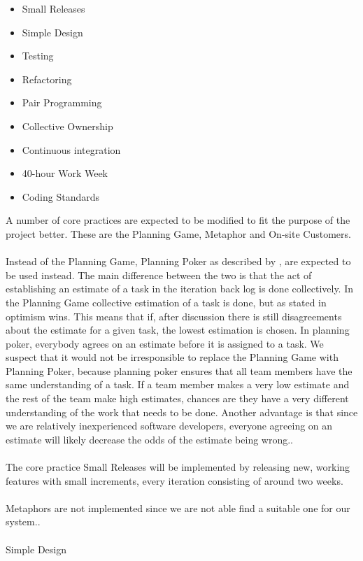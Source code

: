 \begin{itemize}
\item Small Releases
\item Simple Design
\item Testing
\item Refactoring
\item Pair Programming
\item Collective Ownership
\item Continuous integration
\item 40-hour Work Week
\item Coding Standards
\end{itemize}

A number of core practices are expected to be modified to fit the purpose of the project better. These are the Planning Game, Metaphor and On-site Customers.\\\\

Instead of the Planning Game, Planning Poker as described by \citep{xp:planningPoker} , are expected to be used instead. The main difference between the two is that the act of establishing an estimate of a task in the iteration back log is done collectively. In the Planning Game collective estimation of a task is done, but as stated in \citep[p. 58]{xp:planning} optimism wins. This means that if, after discussion there is still disagreements about the estimate for a given task, the lowest estimation is chosen. In planning poker, everybody agrees on an estimate before it is assigned to a task. We suspect that it would not be irresponsible to replace the Planning Game with Planning Poker, because planning poker ensures that all team members have the same understanding of a task. If a team member makes a very low estimate and the rest of the team make high estimates, chances are they have a very different understanding of the work that needs to be done. Another advantage is that since we are relatively inexperienced software developers, everyone agreeing on an estimate will likely decrease the odds of the estimate being wrong..\\\\

The core practice Small Releases will be implemented by releasing new, working features with small increments, every iteration consisting of around two weeks.\\\\

Metaphors are not implemented since we are not able find a suitable one for our system..\\\\

Simple Design 
